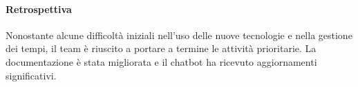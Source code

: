 \documentclass{article}
\begin{document}
            \paragraph{Retrospettiva}  
            Nonostante alcune difficoltà iniziali nell'uso delle nuove tecnologie e nella gestione dei tempi, il team è riuscito a portare a termine le attività prioritarie. La documentazione è stata migliorata e il chatbot ha ricevuto aggiornamenti significativi.
                


\end{document}
